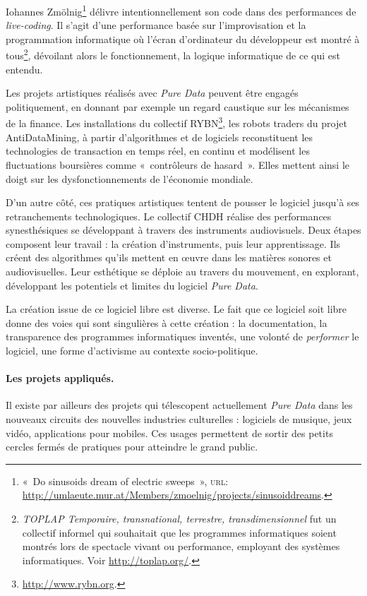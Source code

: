 \documentclass{FramateX}
\begin{document}
\begin{refsection}
Iohannes Zmölnig\footnote{«~Do sinusoids dream of electric sweeps~», \textsc{url}:
\url{http://umlaeute.mur.at/Members/zmoelnig/projects/sinusoiddreams}.}
délivre intentionnellement son code dans des performances de
\textit{live-coding}. Il s'agit d'une
performance basée sur l'improvisation et la programmation informatique
où l'écran d'ordinateur du développeur est montré à
tous\footnote{\textit{TOPLAP Temporaire, transnational, terrestre,
transdimensionnel} fut un collectif informel qui souhaitait que les
programmes informatiques soient montrés lors de spectacle vivant ou
performance, employant des systèmes informatiques. Voir \url{http://toplap.org/}.}, dévoilant alors le
fonctionnement, la logique informatique de ce qui est entendu. 

Les projets artistiques réalisés avec \textit{Pure Data} peuvent être engagés
politiquement, en donnant par exemple un regard caustique sur les
mécanismes de la finance. Les installations du collectif
RYBN\footnote{\url{http://www.rybn.org}.}, les robots traders du projet
AntiDataMining, à partir d'algorithmes et de logiciels reconstituent
les technologies de transaction en temps réel, en continu et modélisent
les fluctuations boursières comme «~contrôleurs de hasard~». Elles
mettent ainsi le doigt sur les dysfonctionnements de l'économie
mondiale. 

D'un autre côté, ces pratiques artistiques tentent de
pousser le logiciel jusqu'à ses retranchements
technologiques. Le collectif CHDH réalise des performances
synesthésiques se développant à travers des instruments audiovisuels.
Deux étapes composent leur travail : la création d'instruments, puis
leur apprentissage. Ils créent des algorithmes qu'ils mettent en œuvre
dans les matières sonores et audiovisuelles. Leur esthétique se
déploie au travers du mouvement, en explorant, développant les
potentiels et limites du logiciel \textit{Pure Data}. 

La création issue de ce logiciel libre est diverse. Le fait que ce
logiciel soit libre donne des voies qui sont singulières à cette
création : la documentation, la transparence des programmes
informatiques inventés, une volonté de \textit{performer} le logiciel, une forme
d'activisme au contexte socio-politique. 

\paragraph{Les projets appliqués.}
Il existe par ailleurs des projets qui télescopent actuellement \textit{Pure
Data} dans les nouveaux circuits des nouvelles industries culturelles :
logiciels de musique, jeux vidéo, applications pour mobiles. Ces usages
permettent de sortir des petits cercles fermés de pratiques pour
atteindre le grand public. 


\end{refsection}
\end{document}
